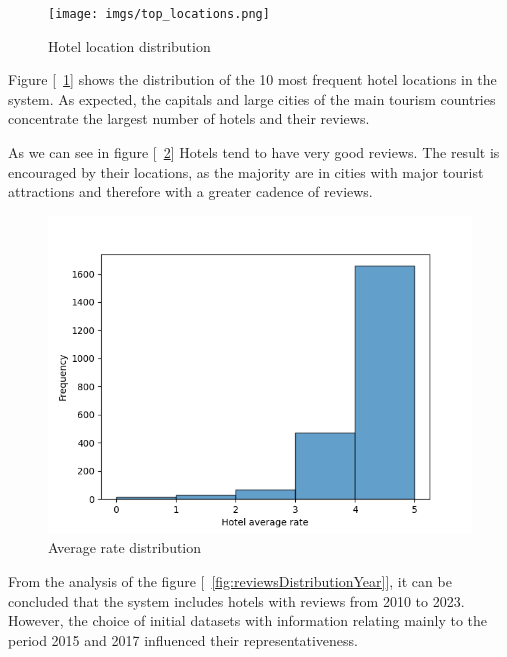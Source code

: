 \documentclass[sigconf]{acmart}
\begin{document}
\begin{figure}[h]
  \centering
  \texttt{[image: imgs/top\_locations.png]}
  \caption{Hotel location distribution}
  \label{fig:hotelLocationDistribution}
\end{figure}


Figure [~\ref{fig:hotelLocationDistribution}] shows the distribution of the 10 most frequent hotel locations in the system. As expected, the capitals and large cities of the main tourism countries concentrate the largest number of hotels and their reviews.



As we can see in figure [~\ref{fig:averageRateDistribution}] Hotels tend to have very good reviews. The result is encouraged by their locations, as the majority are in cities with major tourist attractions and therefore with a greater cadence of reviews.

\begin{figure}[H]
  \centering
  \includegraphics[width=\linewidth]{imgs/rating_distributions.png}
  \caption{Average rate distribution}
  \label{fig:averageRateDistribution}
\end{figure}

From the analysis of the figure [~\ref{fig:reviewsDistributionYear}], it can be concluded that the system includes hotels with reviews from 2010 to 2023. However, the choice of initial datasets with information relating mainly to the period 2015 and 2017 influenced their representativeness.
\end{document}
